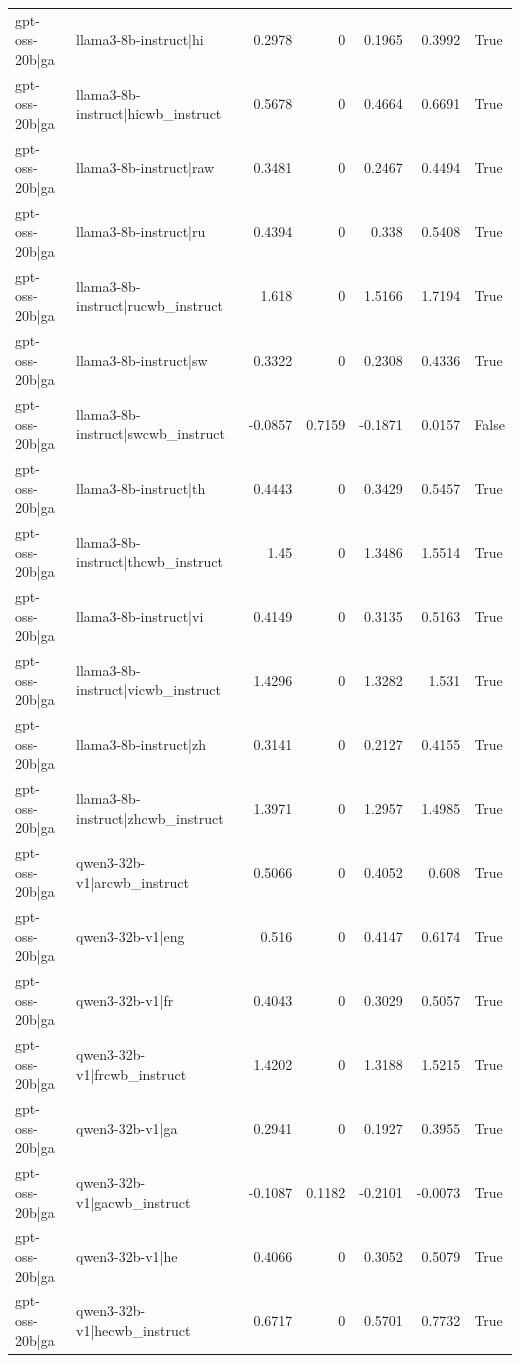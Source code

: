 \begin{table}
\begin{tabular}{l l r r r r l}
gpt-oss-20b|ga & llama3-8b-instruct|hi & 0.2978 & 0 & 0.1965 & 0.3992 & True \\
gpt-oss-20b|ga & llama3-8b-instruct|hicwb_instruct & 0.5678 & 0 & 0.4664 & 0.6691 & True \\
gpt-oss-20b|ga & llama3-8b-instruct|raw & 0.3481 & 0 & 0.2467 & 0.4494 & True \\
gpt-oss-20b|ga & llama3-8b-instruct|ru & 0.4394 & 0 & 0.338 & 0.5408 & True \\
gpt-oss-20b|ga & llama3-8b-instruct|rucwb_instruct & 1.618 & 0 & 1.5166 & 1.7194 & True \\
gpt-oss-20b|ga & llama3-8b-instruct|sw & 0.3322 & 0 & 0.2308 & 0.4336 & True \\
gpt-oss-20b|ga & llama3-8b-instruct|swcwb_instruct & -0.0857 & 0.7159 & -0.1871 & 0.0157 & False \\
gpt-oss-20b|ga & llama3-8b-instruct|th & 0.4443 & 0 & 0.3429 & 0.5457 & True \\
gpt-oss-20b|ga & llama3-8b-instruct|thcwb_instruct & 1.45 & 0 & 1.3486 & 1.5514 & True \\
gpt-oss-20b|ga & llama3-8b-instruct|vi & 0.4149 & 0 & 0.3135 & 0.5163 & True \\
gpt-oss-20b|ga & llama3-8b-instruct|vicwb_instruct & 1.4296 & 0 & 1.3282 & 1.531 & True \\
gpt-oss-20b|ga & llama3-8b-instruct|zh & 0.3141 & 0 & 0.2127 & 0.4155 & True \\
gpt-oss-20b|ga & llama3-8b-instruct|zhcwb_instruct & 1.3971 & 0 & 1.2957 & 1.4985 & True \\
gpt-oss-20b|ga & qwen3-32b-v1|arcwb_instruct & 0.5066 & 0 & 0.4052 & 0.608 & True \\
gpt-oss-20b|ga & qwen3-32b-v1|eng & 0.516 & 0 & 0.4147 & 0.6174 & True \\
gpt-oss-20b|ga & qwen3-32b-v1|fr & 0.4043 & 0 & 0.3029 & 0.5057 & True \\
gpt-oss-20b|ga & qwen3-32b-v1|frcwb_instruct & 1.4202 & 0 & 1.3188 & 1.5215 & True \\
gpt-oss-20b|ga & qwen3-32b-v1|ga & 0.2941 & 0 & 0.1927 & 0.3955 & True \\
gpt-oss-20b|ga & qwen3-32b-v1|gacwb_instruct & -0.1087 & 0.1182 & -0.2101 & -0.0073 & True \\
gpt-oss-20b|ga & qwen3-32b-v1|he & 0.4066 & 0 & 0.3052 & 0.5079 & True \\
gpt-oss-20b|ga & qwen3-32b-v1|hecwb_instruct & 0.6717 & 0 & 0.5701 & 0.7732 & True \\

\end{tabular}
\end{table}
